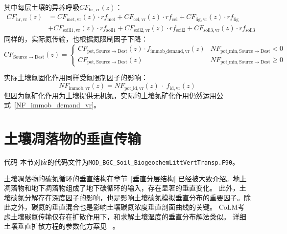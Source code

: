 其中每层土壤的异养呼吸$CF_{\mathrm{hr,vr}}\left(z\right)$：
\begin{equation}
  \begin{aligned}
    C F_{\mathrm{h r, vr}}(z)&=C F_{\mathrm{met, vr}}(z) \cdot r f_{\mathrm{met}}+C F_{\mathrm{cel, vr}}(z) \cdot r f_{\mathrm{cel}}+C F_{\mathrm{lig, vr}}(z) \cdot r f_{\mathrm{lig}} \\
    &+C F_{\mathrm{{soill } 1, vr}}(z) \cdot r f_{\mathrm{{soil1 }}}+C F_{\mathrm{{soil2,vr }}}(z) \cdot r f_{\mathrm{{soil2 }}}+C F_{\mathrm{{soil3,vr }}}(z) \cdot r f_{\mathrm{{soil3 }}}
  \end{aligned}
\end{equation}
同样的，实际氮传输，也根据氮限制因子下降：
\begin{equation}
  CF_{\mathrm{Source \rightarrow Dest}}(z)=\left\{\begin{array}{ll} CF_{\mathrm{pot, Source \rightarrow Dest}}(z) \cdot f_{\mathrm{immob\_demand, vr}}(z) & NF_{\mathrm{pot\_{min, Source \rightarrow Dest}}} <0 \\
      CF_{\mathrm{pot, Source \rightarrow Dest}}(z) & NF_{\mathrm{pot\_{min, Source\rightarrow Dest}}} \geqslant 0
  \end{array}\right.
\end{equation}

实际土壤氮固化作用同样受氮限制因子的影响：
\begin{equation}
  NF_{\mathrm{immob,vr}}(z)=NF_{\mathrm{pot\_id,vr}}(z)\ \cdot\ f_{\mathrm{id,vr}}(z)
\end{equation}
但因为氮矿化作用为土壤提供无机氮，实际的土壤氮矿化作用仍然运用公式~\eqref{NF_immob_demand_vr}。


\section{土壤凋落物的垂直传输}\label{土壤凋落物的垂直传输}
\begin{mymdframed}{代码}
  本节对应的代码文件为\texttt{MOD\_BGC\_Soil\_BiogeochemLittVertTransp.F90}。
\end{mymdframed}

土壤凋落物的碳氮循环的垂直结构在章节~\ref{垂直分层结构} 已经被大致介绍。地上凋落物和地下凋落物组成了地下碳循环的输入，存在显著的垂直变化。
此外，土壤碳氮分解存在深度因子的影响，也是影响土壤碳氮模拟垂直分布的重要因子。除此之外，碳氮的垂直混合也是影响土壤碳氮浓度垂直剖面曲线的关键。
CoLM考虑土壤碳氮传输仅存在扩散作用下，和求解土壤湿度的垂直分布解法类似。
详细土壤垂直扩散方程的参数化方案见~\citet{koven2009formation,koven2011permafrost,koven2013effect,koven2015permafrost} 。
